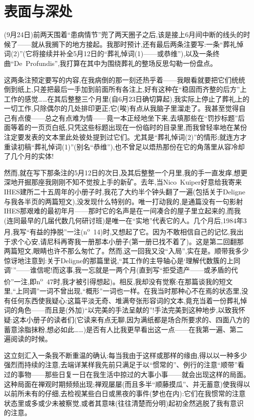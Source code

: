 \section{表面与深处}


(9月24日)前两天围着“患病情节”兜了两天圈子之后,该是接上6月间中断的线头的时候了——就从我搁下的地方接起。我那时预计,还有最后两条注要写:一条“葬礼悼词(2)”(它将接续并补全5月12日的“葬礼悼词(1)——或恭维”),以及一条终曲“De~Profundis”,我打算在其中为围绕葬礼的整场反思勾勒一份盘点。

这两条注预定要写的内容,在我病倒的那一刻还热乎着——我眼看就要把它们统统倒到纸上,只差把最后一手加到前面所有各注上,好有这种在“稳固而齐整的后方”上工作的感觉……在其后整整三个月里(自6月23日确切算起),我实际上停止了葬礼上的一切工作,只除偶尔的几处排印更正;它(唉)有点从我脑子里溜走了。我甚至觉得自己有点傻——总之有点难为情——竟一本正经地坐下来,去填那些在“罚抄标题”后面等着的一页页白纸,只凭这些标题出现在一份临时的目录里,而我曾轻率地在某份注定要发表的文本里此处彼处提到过它们。\dmark{}尤其是“葬礼悼词(2)”的情形;就连方才重读初稿“葬礼悼词(1)”(别名“恭维”),也不曾足以焐热那份在它的角落里从容冷却了几个月的实体!

然而,就在写下那条注的5月12日的次日,及其后整整一个月里,我的手一直发痒,想更深地开掘那座我刚刚不知不觉按上手的新矿。去年,当Nico~Kuiper好意给我寄来IHES建所二十五周年的小册子时,我花了大约半个钟头翻了一遍(包括关于Deligne与我各半页的两篇短文),没发现什么特别的。唯一打动我的,是通篇没有一句影射IHES那艰难的最初年月——那时它的名声是在一间凑合的屋子里立起来的,而我(连同最早的几届代数几何研讨班)是唯一在“实地”代表它的人。几个月后,1984年3月,我写“有益的挣脱”一注(n\textsuperscript{o}~14)时,又想起了它。因为不敢相信自己的记忆,我出于求个心安,请尼科再寄我一册那本小册子(第一册已找不着了)。这是第二回翻那两篇短文,眼睛也许不那么匆忙了。然而,这一回我又没“入局”,实在是。顺带我多少惊讶地注意到:关于Deligne的那篇里说,“其工作的主导轴心是‘理解代数簇的上同调’”——谁信呢!而这事,我一忘就是一两个月(直到写“拒受遗产——或矛盾的代价”一注,即n\textsuperscript{o}~47时,我才被引得想起)。相反,我却没有觉察:在那篇谈我的短文里,“上同调”一词不曾出现,“概形”一词也一样。在我当时那种心不在焉的状态里,没有任何东西使我疑心:这篇平淡无奇、堆满夸张形容词的文本,竟充当着一份葬礼悼词的角色——而且是(外加)“以完美的手法呈献的”!手法完美到这种地步,以致我怀疑:这本小册子的读者们(它读来有点无聊,因为满纸都是场合所要求的、四面八方的蓄意涂脂抹粉,想必如此……)是否有人比我更早看出这一点——在我第一遍、第二遍阅读的时候。

这立刻汇入一条我不断重温的确认:每当我由于这样或那样的缘由,得以以一种\dmark{}多少强烈而持续的注意,去端详某样我先前只满足于以“惯常的”、例行的注意“顺带”看过的事物——那些日复一日在我生活中掠过的大事小事——就会出现这样的局面。这种局面在禅观时期频频出现;禅观屡屡(而且多半“顺藤摸瓜”、并无蓄意)使我得以以前所未有的仔细,去检视某些白日或黑夜的事件(梦也在内):它们在我惯常的注意状态里或多或少未被察觉,或者其意味(往往清楚而分明)起初全然逃脱了我有意识的注意。

